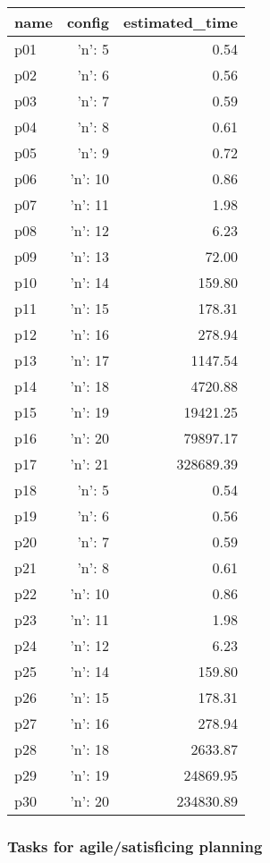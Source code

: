 \documentclass{article}
\begin{document}
                            \begin{center}
                            \scriptsize
                            \begin{tabular}{@{}l|r|r@{}}
                            name & config & estimated\_time\\\midrule
                              p01&{'n': 5}&0.54\\
  p02&{'n': 6}&0.56\\
  p03&{'n': 7}&0.59\\
  p04&{'n': 8}&0.61\\
  p05&{'n': 9}&0.72\\
  p06&{'n': 10}&0.86\\
  p07&{'n': 11}&1.98\\
  p08&{'n': 12}&6.23\\
  p09&{'n': 13}&72.00\\
  p10&{'n': 14}&159.80\\
  p11&{'n': 15}&178.31\\
  p12&{'n': 16}&278.94\\
  p13&{'n': 17}&1147.54\\
  p14&{'n': 18}&4720.88\\
  p15&{'n': 19}&19421.25\\
  p16&{'n': 20}&79897.17\\
  p17&{'n': 21}&328689.39\\
  p18&{'n': 5}&0.54\\
  p19&{'n': 6}&0.56\\
  p20&{'n': 7}&0.59\\
  p21&{'n': 8}&0.61\\
  p22&{'n': 10}&0.86\\
  p23&{'n': 11}&1.98\\
  p24&{'n': 12}&6.23\\
  p25&{'n': 14}&159.80\\
  p26&{'n': 15}&178.31\\
  p27&{'n': 16}&278.94\\
  p28&{'n': 18}&2633.87\\
  p29&{'n': 19}&24869.95\\
  p30&{'n': 20}&234830.89
                            \end{tabular}
                            \end{center}
                    

                                \subsubsection*{Tasks for agile/satisficing planning}
                                
\end{document}
